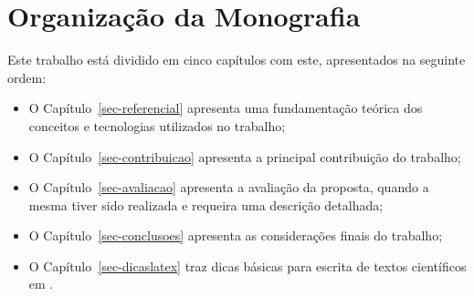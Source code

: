 \section{Organização da Monografia}
\label{sec-intro-organizacao}

Este trabalho está dividido em cinco capítulos com este, apresentados na seguinte ordem:


\begin{itemize}
	\item O Capítulo~\ref{sec-referencial} apresenta uma fundamentação teórica dos conceitos e tecnologias
 utilizados no trabalho;
	
	\item O Capítulo~\ref{sec-contribuicao} apresenta a principal contribuição do trabalho;
	
	\item O Capítulo~\ref{sec-avaliacao} apresenta a avaliação da proposta, quando a mesma tiver sido realizada e requeira uma descrição detalhada;
	
	\item O Capítulo~\ref{sec-conclusoes} apresenta as considerações finais do trabalho;
	
	\item O Capítulo~\ref{sec-dicaslatex} traz dicas básicas para escrita de textos científicos em \latex.
\end{itemize}



